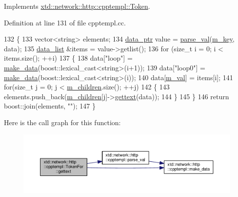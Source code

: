 Implements \hyperlink{classxtd_1_1network_1_1http_1_1cpptempl_1_1Token_a5aeb3ae0fe7478101eaaa90898709a1b}{xtd\-::network\-::http\-::cpptempl\-::\-Token}.



Definition at line 131 of file cpptempl.\-cc.


\begin{DoxyCode}
132 \{
133   vector<string> elements;
134   \hyperlink{namespacextd_1_1network_1_1http_1_1cpptempl_ad2f49991f1902699a98cf62bf0ae7ce6}{data\_ptr} value = \hyperlink{namespacextd_1_1network_1_1http_1_1cpptempl_af79d10d06cd5bc9ce629bb2d21fbcfd6}{parse\_val}(\hyperlink{classxtd_1_1network_1_1http_1_1cpptempl_1_1TokenFor_a30879f48f3ad6e5e61f6191a702743e4}{m\_key}, data);
135   \hyperlink{namespacextd_1_1network_1_1http_1_1cpptempl_aff1b51bcf8064f69c85dd4833c1853b4}{data\_list} &items = value->getlist();
136   \textcolor{keywordflow}{for} (\textcolor{keywordtype}{size\_t} i = 0; i < items.size(); ++i)
137   \{
138     data[\textcolor{stringliteral}{"loop"}] = \hyperlink{namespacextd_1_1network_1_1http_1_1cpptempl_a32fe5ec0914372b09492647a168dbbcb}{make\_data}(boost::lexical\_cast<string>(i+1));
139     data[\textcolor{stringliteral}{"loop0"}] = \hyperlink{namespacextd_1_1network_1_1http_1_1cpptempl_a32fe5ec0914372b09492647a168dbbcb}{make\_data}(boost::lexical\_cast<string>(i));
140     data[\hyperlink{classxtd_1_1network_1_1http_1_1cpptempl_1_1TokenFor_a262fbad437a0b5aeed05a73c315f865b}{m\_val}] = items[i];
141     \textcolor{keywordflow}{for}(\textcolor{keywordtype}{size\_t} j = 0; j < \hyperlink{classxtd_1_1network_1_1http_1_1cpptempl_1_1TokenFor_a2ee55240eafb3c90b7a0c96c0ad253a5}{m\_children}.size(); ++j)
142     \{
143       elements.push\_back(\hyperlink{classxtd_1_1network_1_1http_1_1cpptempl_1_1TokenFor_a2ee55240eafb3c90b7a0c96c0ad253a5}{m\_children}[j]->\hyperlink{classxtd_1_1network_1_1http_1_1cpptempl_1_1TokenFor_a27dde182755e5a44c3d11f1a1ed9aa65}{gettext}(data));
144     \}
145   \}
146   \textcolor{keywordflow}{return} boost::join(elements, \textcolor{stringliteral}{""});
147 \}
\end{DoxyCode}


Here is the call graph for this function\-:
\nopagebreak
\begin{figure}[H]
\begin{center}
\leavevmode
\includegraphics[width=350pt]{classxtd_1_1network_1_1http_1_1cpptempl_1_1TokenFor_a27dde182755e5a44c3d11f1a1ed9aa65_cgraph}
\end{center}
\end{figure}


